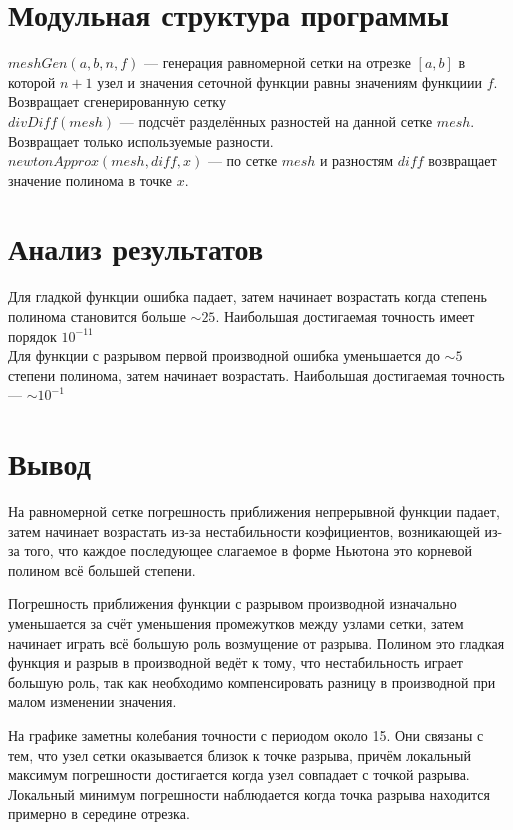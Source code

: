 \documentclass[a4paper]{article}
\begin{document}
\section{Модульная структура программы}
$meshGen(a,b,n,f)$ --- генерация равномерной сетки на отрезке $[a,b]$ в которой $n+1$ узел и значения сеточной функции равны значениям функциии $f$. Возвращает сгенерированную сетку\\
$divDiff(mesh)$ --- подсчёт разделённых разностей на данной сетке $mesh$. Возвращает только используемые разности.\\
$newtonApprox(mesh, diff, x)$ --- по сетке $mesh$ и разностям $diff$ возвращает значение полинома в точке $x$.
\section{Анализ результатов}
Для гладкой функции ошибка падает, затем начинает возрастать когда степень полинома становится больше $\sim 25$. Наибольшая достигаемая точность имеет порядок $10^{-11}$\\
Для функции с разрывом первой производной ошибка уменьшается до $\sim 5$ степени полинома, затем начинает возрастать. Наибольшая достигаемая точность --- $\sim 10^{-1}$
\section{Вывод}
На равномерной сетке погрешность приближения непрерывной функции падает, затем начинает возрастать из-за нестабильности коэфициентов, возникающей из-за того, что каждое последующее слагаемое в форме Ньютона это корневой полином всё большей степени.

Погрешность приближения функции с разрывом производной изначально уменьшается за счёт уменьшения промежутков между узлами сетки, затем начинает играть всё большую роль возмущение от разрыва. Полином это гладкая функция и разрыв
в производной ведёт к тому, что нестабильность играет большую роль, так как необходимо компенсировать разницу в производной при малом изменении значения.

На графике заметны колебания точности с периодом около 15. Они связаны с тем, что узел сетки оказывается близок к точке разрыва, причём локальный максимум погрешности достигается когда узел совпадает с точкой разрыва.
Локальный минимум погрешности наблюдается когда точка разрыва находится примерно в середине отрезка.
\end{document}

